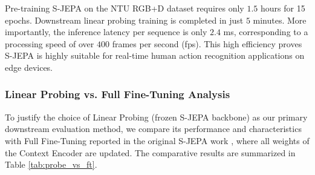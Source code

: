 \documentclass[conference]{IEEEtran}
\newenvironment{newcontent}{\begin{mdframed}[style=newstyle]}{\end{mdframed}}
\begin{document}
\begin{newcontent}
Pre-training S-JEPA on the NTU RGB+D dataset requires only $1.5$ hours for 15 epochs. Downstream linear probing training is completed in just $5$ minutes. More importantly, the inference latency per sequence is only $2.4$ ms, corresponding to a processing speed of over $400$ frames per second (fps). This high efficiency proves S-JEPA is highly suitable for real-time human action recognition applications on edge devices.
\end{newcontent}

\begin{newcontent}
\subsubsection{Linear Probing vs. Full Fine-Tuning Analysis}
To justify the choice of Linear Probing (frozen S-JEPA backbone) as our primary downstream evaluation method, we compare its performance and characteristics with Full Fine-Tuning reported in the original S-JEPA work \cite{b7}, where all weights of the Context Encoder are updated. The comparative results are summarized in Table \ref{tab:probe_vs_ft}.
\end{newcontent}

\begin{table}[htbp]
\centering
\caption[Linear Probing vs. Full Fine-Tuning.]{\hl{Classification Performance Comparison: Linear Probing vs. Full Fine-Tuning.}}
\label{tab:probe_vs_ft}
\end{table}
\end{document}
